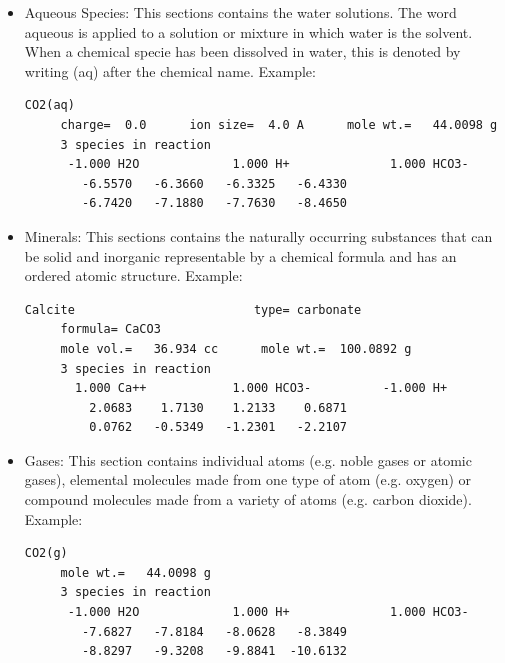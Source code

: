 \documentclass[ppgc,mestrado,English]{iiufrgs}
\begin{document}
\begin{itemize}
\item Aqueous Species: This sections contains the water solutions. The word aqueous is applied to a solution or mixture in which water is the solvent. When a chemical specie has been dissolved in water, this is denoted by writing (aq) after the chemical name. Example:

\begin{minipage}[c]{0.93\textwidth}
\begin{lstlisting}[frame=single, caption=Excerpt of the section Aqueous Species]
CO2(aq)
     charge=  0.0      ion size=  4.0 A      mole wt.=   44.0098 g
     3 species in reaction
      -1.000 H2O             1.000 H+              1.000 HCO3-
        -6.5570   -6.3660   -6.3325   -6.4330
        -6.7420   -7.1880   -7.7630   -8.4650
\end{lstlisting}
\end{minipage}

\item Minerals: This sections contains the naturally occurring substances that can be solid and inorganic representable by a chemical formula and has an ordered atomic structure. Example: 

\begin{minipage}[c]{0.93\textwidth}
\begin{lstlisting}[frame=single, caption=Excerpt of the section Minerals]
Calcite                         type= carbonate
     formula= CaCO3
     mole vol.=   36.934 cc      mole wt.=  100.0892 g
     3 species in reaction
       1.000 Ca++            1.000 HCO3-          -1.000 H+
         2.0683    1.7130    1.2133    0.6871
         0.0762   -0.5349   -1.2301   -2.2107
\end{lstlisting}
\end{minipage}

\item Gases: This section contains individual atoms (e.g. noble gases or atomic gases), elemental molecules made from one type of atom (e.g. oxygen) or compound molecules made from a variety of atoms (e.g. carbon dioxide). Example: 

\begin{minipage}[c]{0.93\textwidth}
\begin{lstlisting}[frame=single, caption=Excerpt of the section Gases]
CO2(g)
     mole wt.=   44.0098 g
     3 species in reaction
      -1.000 H2O             1.000 H+              1.000 HCO3-
        -7.6827   -7.8184   -8.0628   -8.3849
        -8.8297   -9.3208   -9.8841  -10.6132
\end{lstlisting}
\end{minipage}


\end{itemize}
\end{document}
